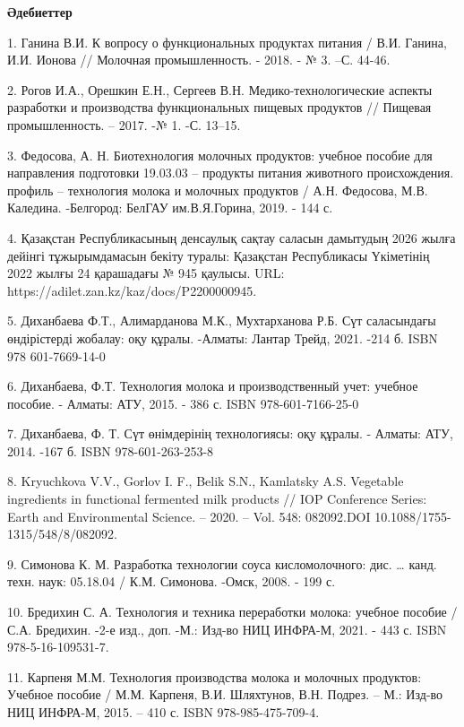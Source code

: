 \begin{center}
{\bfseries Әдебиеттер}
\end{center}

\begin{references}
1. Ганина В.И. К вопросу о функциональных продуктах питания / В.И.
Ганина, И.И. Ионова // Молочная промышленность. - 2018. - № 3. --С.
44-46.

2. Рогов И.А., Орешкин Е.Н., Сергеев В.Н. Медико-технологические аспекты
разработки и производства функциональных пищевых продуктов // Пищевая
промышленность. -- 2017. -№ 1. -С. 13--15.

3. Федосова, А. Н. Биотехнология молочных продуктов: учебное пособие для
направления подготовки 19.03.03 -- продукты питания животного
происхождения. профиль -- технология молока и молочных продуктов /
А.Н. Федосова, М.В. Каледина. -Белгород: БелГАУ им.В.Я.Горина, 2019. -
144 с.

4. Қазақстан Республикасының денсаулық сақтау саласын дамытудың 2026
жылға дейінгі тұжырымдамасын бекіту туралы: Қазақстан Республикасы
Үкіметінің 2022 жылғы 24 қарашадағы № 945 қаулысы. URL:
https://adilet.zan.kz/kaz/docs/P2200000945.

5. Диханбаева Ф.Т., Алимарданова М.К., Мухтарханова Р.Б. Сүт саласындағы
өндірістерді жобалау: оқу құралы. -Алматы: Лантар Трейд, 2021. -214 б.
ISBN 978 601-7669-14-0

6. Диханбаева, Ф.Т. Технология молока и производственный учет: учебное
пособие. - Алматы: АТУ, 2015. - 386 с. ISBN 978-601-7166-25-0

7. Диханбаева, Ф. Т. Сүт өнімдерінің технологиясы: оқу құралы. - Алматы:
АТУ, 2014. -167 б. ISBN 978-601-263-253-8

8. Kryuchkova V.V., Gorlov I. F., Belik S.N., Kamlatsky A.S. Vegetable
ingredients in functional fermented milk products // IOP Conference
Series: Earth and Environmental Science. -- 2020. -- Vol. 548:
082092.DOI 10.1088/1755-1315/548/8/082092.

9. Симонова К. М. Разработка технологии соуса кисломолочного: дис.
\ldots{} канд. техн. наук: 05.18.04 / К.М. Симонова. -Омск, 2008. -
199 с.

10. Бредихин С. А. Технология и техника переработки молока: учебное
пособие / С.А. Бредихин. -2-е изд., доп. -М.: Изд-во НИЦ ИНФРА-М,
2021. - 443 с. ISBN 978-5-16-109531-7.

11. Карпеня М.М. Технология производства молока и молочных продуктов:
Учебное пособие / М.М. Карпеня, В.И. Шляхтунов, В.Н. Подрез. -- М.:
Изд-во НИЦ ИНФРА-М, 2015. -- 410 с. ISBN 978-985-475-709-4.


\end{references}
